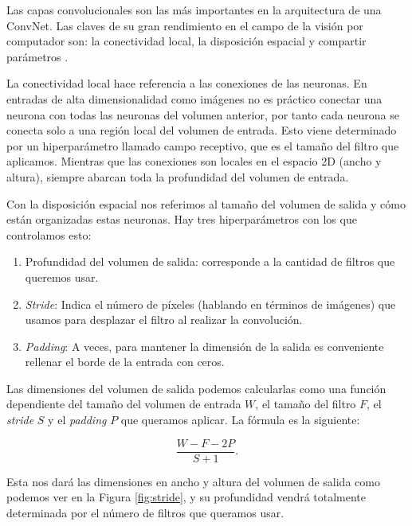 Las capas convolucionales son las más importantes en la arquitectura de una ConvNet. Las claves de su gran rendimiento en el campo de la visión por computador son: la conectividad local, la disposición espacial y compartir parámetros \cite{GoodFellowBook}.

La conectividad local hace referencia a las conexiones de las neuronas. En entradas de alta dimensionalidad como imágenes no es práctico conectar una neurona con todas las neuronas del volumen anterior, por tanto cada neurona se conecta solo a una región local del volumen de entrada. Esto viene determinado por un hiperparámetro llamado campo receptivo, que es el tamaño del filtro que aplicamos. Mientras que las conexiones son locales en el espacio 2D (ancho y altura), siempre abarcan toda la profundidad del volumen de entrada.

Con la disposición espacial nos referimos al tamaño del volumen de salida y cómo están organizadas estas neuronas. Hay tres hiperparámetros con los que controlamos esto:

\begin{enumerate}

	\item Profundidad del volumen de salida: corresponde a la cantidad de filtros que queremos usar.
	
	\item \textit{Stride}: Indica el número de píxeles (hablando en términos de imágenes) que usamos para desplazar el filtro al realizar la convolución.
	
	\item \textit{Padding}: A veces, para mantener la dimensión de la salida es conveniente rellenar el borde de la entrada con ceros.

\end{enumerate}


Las dimensiones del volumen de salida podemos calcularlas como una función dependiente del tamaño del volumen de entrada $W$, el tamaño del filtro $F$, el \textit{stride} $S$ y el \textit{padding} $P$ que queramos aplicar. La fórmula es la siguiente:

\begin{equation}\label{eq:output}
\frac{W-F-2P}{S+1}.
\end{equation}

Esta nos dará las dimensiones en ancho y altura del volumen de salida como podemos ver en la Figura \ref{fig:stride}, y su profundidad vendrá totalmente determinada por el número de filtros que queramos usar.

